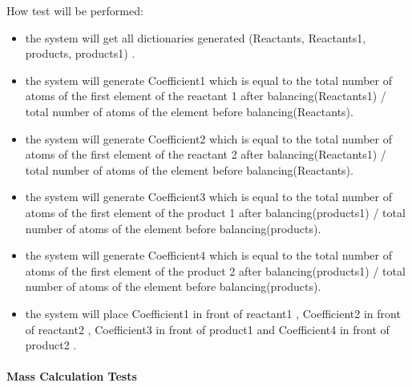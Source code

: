 \documentclass[12pt, titlepage]{article}
\begin{document}
\begin{enumerate}
How test will be performed: 
\begin{itemize}
\item the system will get all dictionaries generated (Reactants, Reactants1, products, products1) . 
\item the system will generate Coefficient1 which is equal to the total number of atoms of the first element of the reactant 1 after balancing(Reactants1) / total number of atoms of the element before balancing(Reactants).
\item the system will generate Coefficient2 which is equal to the total number of atoms of the first element of the reactant 2 after balancing(Reactants1) / total number of atoms of the element before balancing(Reactants).
\item the system will generate Coefficient3 which is equal to the total number of atoms of the first element of the product 1 after balancing(products1) / total number of atoms of the element before balancing(products).
\item the system will generate Coefficient4 which is equal to the total number of atoms of the first element of the product 2 after balancing(products1) / total number of atoms of the element before balancing(products).
\item the system will place Coefficient1 in front of reactant1 , Coefficient2 in front of reactant2 , Coefficient3 in front of product1 and Coefficient4 in front of product2 . 
\end{itemize}

\end{enumerate}

\paragraph{Mass Calculation Tests}
\end{document}
